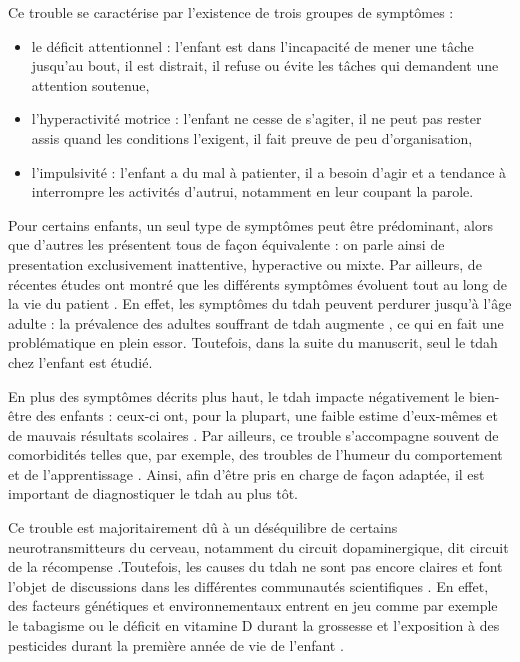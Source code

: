 Ce trouble se caractérise par l'existence de trois groupes de symptômes \citep{HAS} : 
\begin{itemize}
\item le déficit attentionnel : l'enfant est dans l'incapacité de mener une tâche jusqu'au bout, il est distrait, il refuse ou évite les tâches qui demandent
une attention soutenue,
\item l'hyperactivité motrice : l'enfant ne cesse de s'agiter, il ne peut pas rester assis quand les conditions l'exigent, il fait preuve de peu d'organisation,
\item l'impulsivité : l'enfant a du mal à patienter, il a besoin d'agir et a tendance à interrompre les activités d'autrui, notamment en leur coupant la parole.
\end{itemize}
Pour certains enfants, un seul type de symptômes peut être prédominant, alors que d'autres les présentent tous de façon équivalente \citep{DSM-5} : 
on parle ainsi de presentation exclusivement inattentive, hyperactive ou mixte. Par ailleurs, de récentes 
études ont montré que les différents symptômes évoluent tout au long de la vie du patient \citep{CFDCAP, Epstein2013}. En effet, les symptômes du \gls{tdah}
peuvent perdurer jusqu'à l'âge adulte \citep{Faraone2006} : la prévalence des adultes souffrant de \gls{tdah} augmente \citep{Chung2019, Weibel2019}, 
ce qui en fait une problématique en plein essor. Toutefois, dans la suite du manuscrit, seul le \gls{tdah} chez l'enfant est étudié. 

En plus des symptômes décrits plus haut, le \gls{tdah} impacte négativement le bien-être des enfants : ceux-ci ont, pour la plupart, une faible estime d'eux-mêmes 
\citep{Shaw2005} et de mauvais résultats scolaires \citep{Barry2002}. Par ailleurs, ce trouble s'accompagne souvent de comorbidités telles que, par exemple, 
des troubles de l'humeur du comportement et de l'apprentissage \citep{Monastra2005}. Ainsi, afin d'être pris en charge de façon adaptée, il est 
important de diagnostiquer le \gls{tdah} au plus tôt. 

Ce trouble est majoritairement dû à un déséquilibre de certains neurotransmitteurs du cerveau, notamment du circuit dopaminergique, 
dit circuit de la récompense \citep{Daley2010, Punja2016}.Toutefois, les causes du \gls{tdah} ne sont pas encore claires et font l'objet de discussions
dans les différentes communautés scientifiques \citep{Galera2014}. En effet, des facteurs génétiques et environnementaux entrent en jeu comme par exemple le tabagisme ou le déficit en
vitamine D durant la grossesse et l'exposition à des pesticides durant la première année de vie de l'enfant \citep{Galera2014, Sucksdorff2019}.

